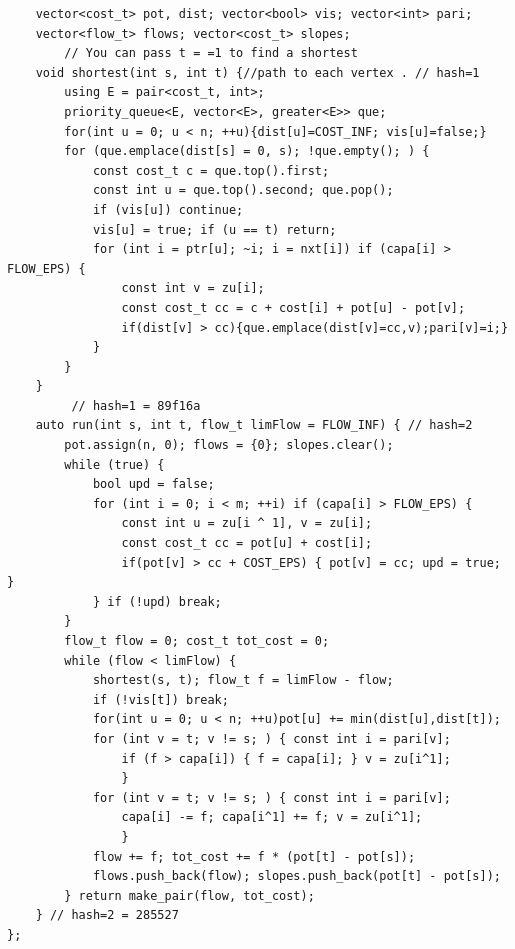 \documentclass[11pt, a4paper, twoside]{article}
\begin{document}
\begin{verbatim}
    vector<cost_t> pot, dist; vector<bool> vis; vector<int> pari;
    vector<flow_t> flows; vector<cost_t> slopes;
        // You can pass t = =1 to find a shortest
    void shortest(int s, int t) {//path to each vertex . // hash=1
        using E = pair<cost_t, int>;
        priority_queue<E, vector<E>, greater<E>> que;
        for(int u = 0; u < n; ++u){dist[u]=COST_INF; vis[u]=false;}
        for (que.emplace(dist[s] = 0, s); !que.empty(); ) {
            const cost_t c = que.top().first;
            const int u = que.top().second; que.pop();
            if (vis[u]) continue;
            vis[u] = true; if (u == t) return;
            for (int i = ptr[u]; ~i; i = nxt[i]) if (capa[i] > FLOW_EPS) {
                const int v = zu[i];
                const cost_t cc = c + cost[i] + pot[u] - pot[v];
                if(dist[v] > cc){que.emplace(dist[v]=cc,v);pari[v]=i;}
            }
        }
    }
         // hash=1 = 89f16a
    auto run(int s, int t, flow_t limFlow = FLOW_INF) { // hash=2
        pot.assign(n, 0); flows = {0}; slopes.clear();
        while (true) {
            bool upd = false;
            for (int i = 0; i < m; ++i) if (capa[i] > FLOW_EPS) {
                const int u = zu[i ^ 1], v = zu[i];
                const cost_t cc = pot[u] + cost[i];
                if(pot[v] > cc + COST_EPS) { pot[v] = cc; upd = true; }
            } if (!upd) break;
        }
        flow_t flow = 0; cost_t tot_cost = 0;
        while (flow < limFlow) {
            shortest(s, t); flow_t f = limFlow - flow;
            if (!vis[t]) break;
            for(int u = 0; u < n; ++u)pot[u] += min(dist[u],dist[t]);
            for (int v = t; v != s; ) { const int i = pari[v];
                if (f > capa[i]) { f = capa[i]; } v = zu[i^1];
                }
            for (int v = t; v != s; ) { const int i = pari[v];
                capa[i] -= f; capa[i^1] += f; v = zu[i^1];
                }
            flow += f; tot_cost += f * (pot[t] - pot[s]);
            flows.push_back(flow); slopes.push_back(pot[t] - pot[s]);
        } return make_pair(flow, tot_cost);
    } // hash=2 = 285527
};
\end{verbatim}
\end{document}
